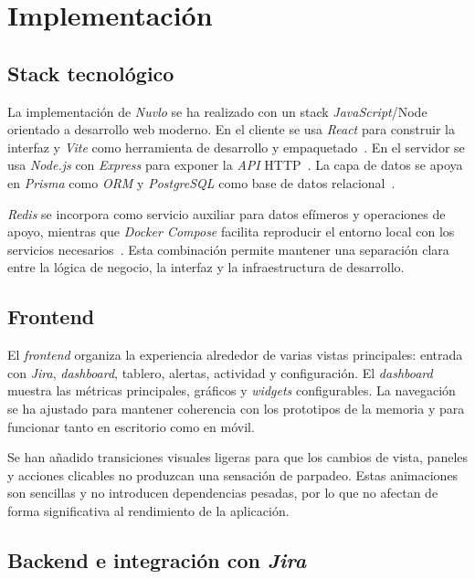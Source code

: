 \chapter{Implementación}

\section{Stack tecnológico}

La implementación de \textit{Nuvlo} se ha realizado con un stack \textit{JavaScript}/Node orientado a desarrollo web moderno. En el cliente se usa \textit{React} para construir la interfaz y \textit{Vite} como herramienta de desarrollo y empaquetado~\cite{ReactDocs,ViteDocs}. En el servidor se usa \textit{Node.js} con \textit{Express} para exponer la \textit{API} HTTP~\cite{NodeDocs,ExpressDocs}. La capa de datos se apoya en \textit{Prisma} como \textit{ORM} y \textit{PostgreSQL} como base de datos relacional~\cite{PrismaDocs,PostgreSQLDocs}.

\textit{Redis} se incorpora como servicio auxiliar para datos efímeros y operaciones de apoyo, mientras que \textit{Docker Compose} facilita reproducir el entorno local con los servicios necesarios~\cite{RedisDocs,DockerComposeDocs}. Esta combinación permite mantener una separación clara entre la lógica de negocio, la interfaz y la infraestructura de desarrollo.

\section{Frontend}

El \textit{frontend} organiza la experiencia alrededor de varias vistas principales: entrada con \textit{Jira}, \textit{dashboard}, tablero, alertas, actividad y configuración. El \textit{dashboard} muestra las métricas principales, gráficos y \textit{widgets} configurables. La navegación se ha ajustado para mantener coherencia con los prototipos de la memoria y para funcionar tanto en escritorio como en móvil.

Se han añadido transiciones visuales ligeras para que los cambios de vista, paneles y acciones clicables no produzcan una sensación de parpadeo. Estas animaciones son sencillas y no introducen dependencias pesadas, por lo que no afectan de forma significativa al rendimiento de la aplicación.

\section{Backend e integración con \textit{Jira}}

